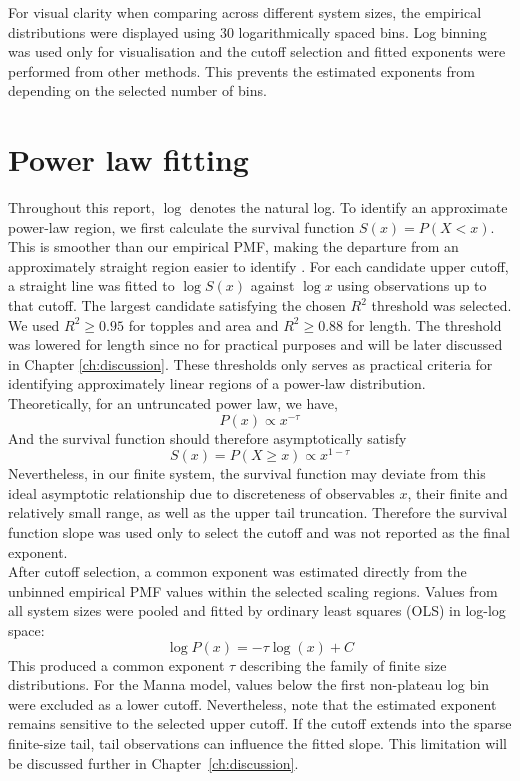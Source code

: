For visual clarity when comparing across different system sizes, the empirical distributions were displayed using 30 logarithmically spaced bins. Log binning was used only for visualisation and the cutoff selection and fitted exponents were performed from other methods. This prevents the estimated exponents from depending on the selected number of bins.

\section{Power law fitting}\label{sec:powerlaw}

Throughout this report, $\log$ denotes the natural log. To identify an approximate power-law region, we first calculate the survival function $S(x)=P(X<x)$. This is smoother than our empirical PMF, making the departure from an approximately straight region easier to identify . For each candidate upper cutoff, a straight line was fitted to $\log S(x)$ against $\log x$ using observations up to that cutoff. The largest candidate satisfying the chosen $R^2$ threshold was selected. We used $R^2 \geq 0.95$ for topples and area and $R^2 \geq 0.88$ for length. The threshold was lowered for length since no for practical purposes and will be later discussed in Chapter \ref{ch:discussion}. These thresholds only serves as practical criteria for identifying approximately linear regions of a power-law distribution.\\

Theoretically, for an untruncated power law, we have,
\[
P(x) \propto x^{-\tau}
\]
And the survival function should therefore asymptotically satisfy
\[
S(x)=P(X\geq x) \propto x^{1-\tau}
\]
Nevertheless, in our finite system, the survival function may deviate from this ideal asymptotic relationship due to discreteness of observables $x$, their finite and relatively small range, as well as the upper tail truncation. Therefore the survival function slope was used only to select the cutoff and was not reported as the final exponent.\\

After cutoff selection, a common exponent was estimated directly from the unbinned empirical PMF values within the selected scaling regions. Values from all system sizes were pooled and fitted by ordinary least squares (OLS) in log-log space:
\[
\log P(x) = -\tau \log(x)+C
\]
This produced a common exponent $\tau$ describing the family of finite size distributions. For the Manna model, values below the first non-plateau log bin were excluded as a lower cutoff. Nevertheless, note that the estimated exponent remains sensitive to the selected upper cutoff. If the cutoff extends into the sparse finite-size tail, tail observations can influence the fitted slope. This limitation will be discussed further in Chapter~\ref{ch:discussion}.\\

